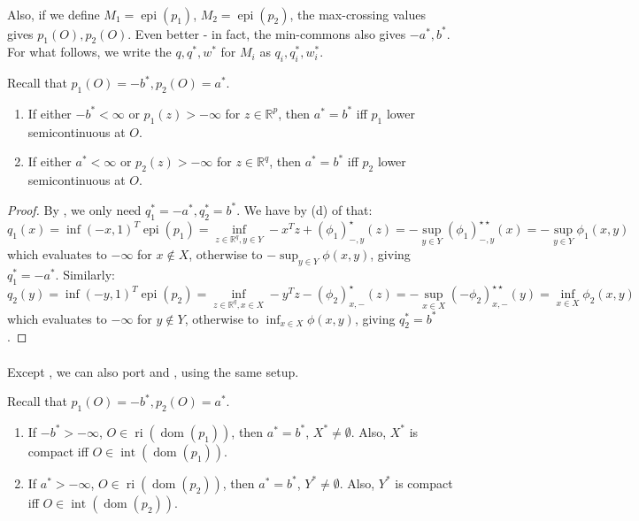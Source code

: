 \paragraph{}Also, if we define $M_1=\operatorname{epi}(p_1)$, $M_2=\operatorname{epi}(p_2)$, the max-crossing values gives $p_1(O),p_2(O)$. Even better - in fact, the min-commons also gives $-a^\ast,b^\ast$. For what follows, we write the $q,q^\ast,w^\ast$ for $M_i$ as $q_i,q^\ast_i,w^\ast_i$.

\begin{prop}\label{prop:047-minimax-strong-duality}Recall that $p_1(O)=-b^\ast,p_2(O)=a^\ast$.
	\begin{enumerate}[label=(\alph*)]
		\item If either $-b^\ast<\infty$ or $p_1(z)>-\infty$ for $z\in \mathbb{R}^p$, then $a^\ast=b^\ast$ iff $p_1$ lower semicontinuous at $O$.
		\item If either $a^\ast<\infty$ or $p_2(z)>-\infty$ for $z\in \mathbb{R}^q$, then $a^\ast=b^\ast$ iff $p_2$ lower semicontinuous at $O$.
	\end{enumerate}
\end{prop}

\begin{proof}
	By , we only need $q_1^\ast=-a^\ast,q_2^\ast=b^\ast$. We have by (d) of  that:
	\[
		q_1(x)=\inf(-x,1)^T \operatorname{epi}(p_1)=\inf_{z\in \mathbb{R}^q,y\in Y}-x^Tz+(\phi_1)_{-,y}^\star(z)=-\sup_{y\in Y}(\phi_1)_{-,y}^{\star\star}(x)=-\sup_{y\in Y}\phi_1(x,y)
	\]
	which evaluates to $-\infty$ for $x\notin X$, otherwise to $-\sup_{y\in Y}{\phi}(x,y)$, giving $q_1^\ast=-a^\ast$. Similarly:
	\[
		q_2(y)=\inf(-y,1)^T \operatorname{epi}(p_2)=\inf_{z\in \mathbb{R}^q,x\in X}-y^Tz-(\phi_2)_{x,-}^\star(z)=-\sup_{x\in X}(-\phi_2)_{x,-}^{\star\star}(y)=\inf_{x\in X}\phi_2(x,y)
	\]
	which evaluates to $-\infty$ for $y\notin Y$, otherwise to $\inf_{x\in X}{\phi}(x,y)$, giving $q_2^\ast=b^\ast$.
\end{proof}

\paragraph{}Except , we can also port  and , using the same setup.

\begin{prop}\label{prop:047-dual-reachability}Recall that $p_1(O)=-b^\ast,p_2(O)=a^\ast$.
	\begin{enumerate}[label=(\alph*)]
		\item If $-b^\ast>-\infty$, $O\in \operatorname{ri}(\operatorname{dom}(p_1))$, then $a^\ast=b^\ast$, $X^\ast\neq\emptyset$. Also, $X^\ast$ is compact iff $O\in \operatorname{int}(\operatorname{dom}(p_1))$.
		\item If $a^\ast>-\infty$, $O\in \operatorname{ri}(\operatorname{dom}(p_2))$, then $a^\ast=b^\ast$, $Y^\ast\neq\emptyset$. Also, $Y^\ast$ is compact iff $O\in \operatorname{int}(\operatorname{dom}(p_2))$.
	\end{enumerate}
\end{prop}

